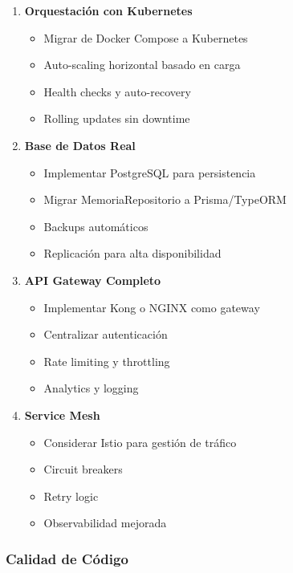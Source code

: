 \documentclass[12pt,a4paper]{article}
\begin{document}
\begin{enumerate}[leftmargin=*]
    \item \textbf{Orquestación con Kubernetes}
    \begin{itemize}
        \item Migrar de Docker Compose a Kubernetes
        \item Auto-scaling horizontal basado en carga
        \item Health checks y auto-recovery
        \item Rolling updates sin downtime
    \end{itemize}

    \item \textbf{Base de Datos Real}
    \begin{itemize}
        \item Implementar PostgreSQL para persistencia
        \item Migrar MemoriaRepositorio a Prisma/TypeORM
        \item Backups automáticos
        \item Replicación para alta disponibilidad
    \end{itemize}

    \item \textbf{API Gateway Completo}
    \begin{itemize}
        \item Implementar Kong o NGINX como gateway
        \item Centralizar autenticación
        \item Rate limiting y throttling
        \item Analytics y logging
    \end{itemize}

    \item \textbf{Service Mesh}
    \begin{itemize}
        \item Considerar Istio para gestión de tráfico
        \item Circuit breakers
        \item Retry logic
        \item Observabilidad mejorada
    \end{itemize}
\end{enumerate}

\subsubsection{Calidad de Código}
\end{document}

